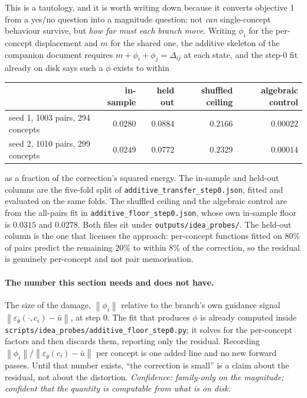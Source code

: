 \documentclass[11pt]{article}
\newcommand{\eps}{\varepsilon}
\newcommand{\epsfr}{\eps_{\bar\theta}}
\newcommand{\norm}[1]{\left\lVert #1 \right\rVert}
\theoremstyle{plain}
\theoremstyle{remark}
\begin{document}
This is a tautology, and it is worth writing down because it converts objective 1 from a yes/no
question into a magnitude question: not \emph{can} single-concept behaviour survive, but \emph{how
far must each branch move}. Writing $\phi_i$ for the per-concept displacement and $m$ for the shared
one, the additive skeleton of the companion document requires $m + \phi_i + \phi_j = \Delta_{ij}$
at each state, and the step-0 fit already on disk says such a $\phi$ exists to within
\begin{center}
\small
\begin{tabular}{lrrrr}
\toprule
 & in-sample & held out & shuffled ceiling & algebraic control \\
\midrule
seed 1, 1003 pairs, 294 concepts & $0.0280$ & $0.0884$ & $0.2166$ & $0.00022$ \\
seed 2, 1010 pairs, 299 concepts & $0.0249$ & $0.0772$ & $0.2329$ & $0.00014$ \\
\bottomrule
\end{tabular}
\end{center}
as a fraction of the correction's squared energy. The in-sample and held-out columns are
the five-fold split of \texttt{additive\_transfer\_step0.json}, fitted and evaluated on the same
folds. The shuffled ceiling and the algebraic control are from the all-pairs fit in
\texttt{additive\_floor\_step0.json}, whose own in-sample floor is $0.0315$ and $0.0278$. Both
files sit under \texttt{outputs/idea\_probes/}. The held-out column is the one that licenses the approach: per-concept
functions fitted on $80\%$ of pairs predict the remaining $20\%$ to within $8\%$ of the correction,
so the residual is genuinely per-concept and not pair memorisation.

\paragraph{The number this section needs and does not have.}
The size of the damage, $\norm{\phi_i}$ relative to the branch's own guidance signal
$\norm{\epsfr(\cdot,c_i) - \bar u}$, at step 0. The fit that produces $\phi$ is already computed
inside \texttt{scripts/idea\_probes/additive\_floor\_step0.py}; it solves for the per-concept
factors and then discards them, reporting only the residual. Recording
$\norm{\phi_i}/\norm{\epsfr(c_i)-\bar u}$ per concept is one added line and no new forward passes.
Until that number exists, ``the correction is small'' is a claim about the residual, not about the
distortion. \emph{Confidence: family-only on the magnitude; confident that the quantity is
computable from what is on disk.}
\end{document}
